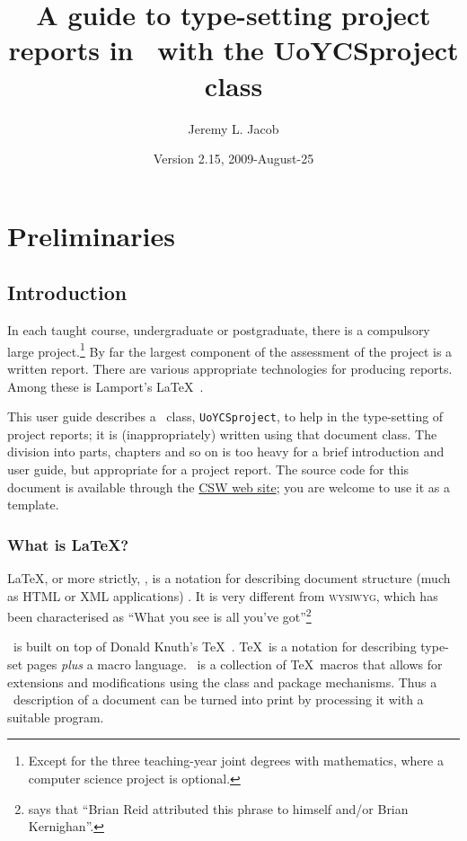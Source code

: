 \documentclass[authoryearcitations]{UoYCSproject}
\author{Jeremy L. Jacob}
\title{A guide to type-setting project reports in \LaTeXe\ with the
  \textsf{UoYCSproject} class}
\date{Version 2.15, 2009-August-25}
\begin{document}
\maketitle
\listoffigures
\listoftables
\renewcommand*{\lstlistlistingname}{List of Listings}
\lstlistoflistings

\cleardoublepage
\part{Preliminaries}
\label{sec:start}
\thispagestyle{empty}\cleardoublepage

\chapter{Introduction}
\label{cha:Introduction}

In each taught course, undergraduate or postgraduate, there is a
compulsory large project.\footnote{Except for the three teaching-year
  joint degrees with mathematics, where a computer science project is
  optional.}  By far the largest component of the assessment of the
project is a written report.  There are various appropriate
technologies for producing reports.  Among these is Lamport's \LaTeX\ 
\citep{Lamport1994}.

This user guide describes a \LaTeXe\ class, \lstinline|UoYCSproject|,
to help in the type-setting of project reports; it is
(inappropriately) written using that document class.  The division
into parts, chapters and so on is too heavy for a brief introduction
and user guide, but appropriate for a project report.  The source code
for this document is available through the
\href{http://www-course.cs.york.ac.uk/csw/}{CSW web site}; you are
welcome to use it as a template.

\section{What is \LaTeX?}
\label{sec:whatislatex}

\LaTeX, or more strictly, \LaTeXe, is a notation for describing
document structure (much as HTML or XML applications)
\citep{Lamport1994}.  It is very different from \textsc{wysiwyg},
which has been characterised as ``What you see is all you've
got''\footnote{\citet[p7, Footnote~1]{Lamport1994} says that ``Brian
  Reid attributed this phrase to himself and/or Brian Kernighan''.}

\LaTeXe\ is built on top of Donald Knuth's \TeX\ \citep{Knuth1984}.
\TeX\ is a notation for describing type-set pages \emph{plus} a macro
language.  \LaTeXe\ is a collection of \TeX\ macros that allows for
extensions and modifications using the class and package mechanisms.
Thus a \LaTeXe\ description of a document can be turned into print by
processing it with a suitable program.
\end{document}
